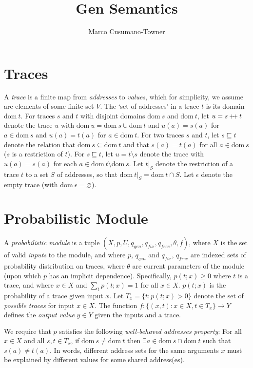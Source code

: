 \documentclass{article}
\title{Gen Semantics}
\author{Marco Cusumano-Towner}
\newcommand\doubleplus{\mathbin{+\mkern-5mu+}}
\newcommand{\concat}[0]{\doubleplus}
\newcommand{\diff}[0]{\setminus}
\newcommand{\dom}[1]{\mbox{dom}{~#1}}
\newcommand{\emptytrace}[0]{\epsilon}
\newcommand{\contained}[0]{\sqsubseteq}
\begin{document}
\maketitle

\section{Traces}
A \emph{trace} is a finite map from \emph{addresses} to \emph{values}, which for simplicity, we assume are elements of some finite set $V$.
The `set of addresses' in a trace $t$ is its domain $\dom{t}$.
For traces $s$ and $t$ with disjoint domains $\dom{s}$ and $\dom{t}$, let $u = s \concat t$ denote the trace $u$ with $\dom{u} = \dom{s} \cup \dom{t}$ and $u(a) = s(a)$ for $a \in \dom{s}$ and $u(a) = t(a)$ for $a \in \dom{t}$.
For two traces $s$ and $t$, let $s \contained t$ denote the relation that $\dom{s} \subseteq \dom{t}$ and that $s(a) = t(a)$ for all $a \in \dom{s}$ ($s$ is a restriction of $t$).
For $s \contained t$, let $u = t \diff s$ denote the trace with $u(a) = s(a)$ for each $a \in \dom{t} \setminus \dom{s}$.
Let $t|_S$ denote the restriction of a trace $t$ to a set $S$ of addresses, so that $\dom{t|_S} = \dom{t} \cap S$.
Let $\emptytrace$ denote the empty trace (with $\dom \emptytrace = \varnothing$).

\section{Probabilistic Module}
A \emph{probabilistic module} is a tuple $(X, p, U, q_{gen}, q_{fix}, q_{free}, \theta, f)$, where $X$ is the set of valid \emph{inputs} to the module, and where $p$, $q_{gen}$ and $q_{fix}$, $q_{free}$ are indexed sets of probability distribution on traces, where $\theta$ are current parameters of the module (upon which $p$ has an implicit dependence).
Specifically, $p(t; x) \ge 0$ where $t$ is a trace, and where $x \in X$ and $\sum_t p(t; x) = 1$ for all $x \in X$.
$p(t; x)$ is the probability of a trace given input $x$.
Let $T_x = \{t : p(t; x) > 0 \}$ denote the set of \emph{possible traces} for input $x \in X$.
The function $f : \{(x, t) : x \in X, t \in T_x\} \to Y$ defines the \emph{output value} $y \in Y$ given the inputs and a trace.

We require that $p$ satisfies the following \emph{well-behaved addresses property}:
For all $x \in X$ and all $s, t \in T_x$, if $\dom{s} \ne \dom{t}$ then $\exists a \in \dom{s} \cap \dom{t}$ such that $s(a) \ne t(a)$.
In words, different address sets for the same arguments $x$ must be explained by different value{s} for some shared address(es).
\end{document}
